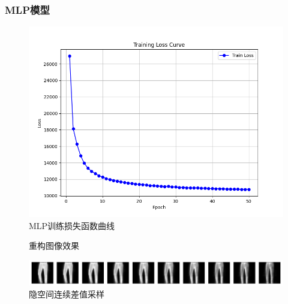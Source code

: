 \documentclass[12pt, a4paper, oneside]{ctexart}
\numberwithin{equation}{section}  %
\begin{document}
\subsubsection{MLP模型}
\begin{figure}[htbp]
    \centering
    \includegraphics[width=0.8\linewidth]{hw1_mlp_loss.png}
    \caption{MLP训练损失函数曲线}
\end{figure}
\begin{figure}[htbp]
  \centering
  \setlength{\abovecaptionskip}{0ex}  %
  \label{fig-1}
  \caption{重构图像效果}
\end{figure}
\begin{figure}[htbp]
    \centering
    \includegraphics[width=\linewidth]{hw1_mlp_smooth_test.png}
    \caption{隐空间连续差值采样}
\end{figure}
\end{document}
